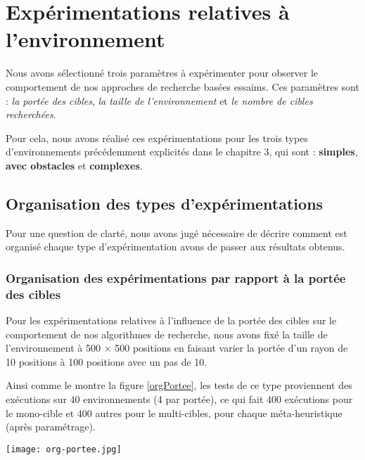 	\section{Expérimentations relatives à l'environnement}
	Nous avons sélectionné trois paramètres à expérimenter pour observer le comportement de nos approches de recherche basées essaims.
	Ces paramètres sont : \textit{la portée des cibles}, \textit{la taille de l'environnement} et \textit{le nombre de cibles recherchées}.
	
	Pour cela, nous avons réalisé ces expérimentations pour les trois types d'environnements précédemment explicités dans le chapitre 3, qui sont : \textbf{simples}, \textbf{avec obstacles} et \textbf{complexes}.
	
	

	

	
	\subsection{Organisation des types d'expérimentations}
	Pour une question de clarté, nous avons jugé nécessaire de décrire comment est organisé chaque type d'expérimentation avons de passer aux résultats obtenus.
	
	
	\subsubsection{Organisation des expérimentations par rapport à la portée des cibles}
	Pour les expérimentations relatives à l'influence de la portée des cibles sur le comportement de nos algorithmes de recherche, nous avons fixé la taille de l'environnement à 500 $\times$ 500 positions en faisant varier la portée d'un rayon de 10 positions à 100 positions avec un pas de 10.
	
	Ainsi comme le montre la figure \ref{orgPortee}, les tests de ce type proviennent des exécutions sur 40 environnements (4 par portée), ce qui fait 400 exécutions pour le mono-cible et 400 autres pour le multi-cibles, pour chaque méta-heuristique (après paramétrage).
	
	\begin{center}	 
		\captionsetup{width=1\linewidth} 
		\texttt{[image: org-portee.jpg]}%
		\vspace{-0.1 cm}
		\label{orgPortee}%
	\end{center}
	
